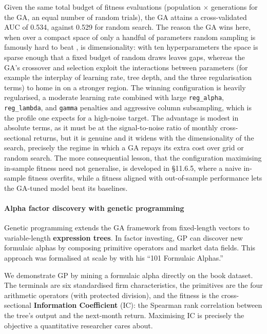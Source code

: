 Given the same total budget of fitness evaluations (population $\times$ generations for the GA, an equal number of random trials), the GA attains a cross-validated AUC of 0.534, against 0.529 for random search. The reason the GA wins here, when over a compact space of only a handful of parameters random sampling is famously hard to beat \citep{bergstra2012random}, is dimensionality: with ten hyperparameters the space is sparse enough that a fixed budget of random draws leaves gaps, whereas the GA's crossover and selection exploit the interactions between parameters (for example the interplay of learning rate, tree depth, and the three regularisation terms) to home in on a stronger region. The winning configuration is heavily regularised, a moderate learning rate combined with large \texttt{reg\_alpha}, \texttt{reg\_lambda}, and \texttt{gamma} penalties and aggressive column subsampling, which is the profile one expects for a high-noise target. The advantage is modest in absolute terms, as it must be at the signal-to-noise ratio of monthly cross-sectional returns, but it is genuine and it widens with the dimensionality of the search, precisely the regime in which a GA repays its extra cost over grid or random search. The more consequential lesson, that the configuration maximising in-sample fitness need not generalise, is developed in §11.6.5, where a naive in-sample fitness overfits, while a fitness aligned with out-of-sample performance lets the GA-tuned model beat its baselines.

\paragraph{Alpha factor discovery with genetic programming}

Genetic programming extends the GA framework from fixed-length vectors to variable-length \textbf{expression trees}. In factor investing, GP can discover new formulaic alphas by composing primitive operators and market data fields. This approach was formalised at scale by \cite{Kakushadze2016} with his ``101 Formulaic Alphas.''

We demonstrate GP by mining a formulaic alpha directly on the book dataset. The terminals are six standardised firm characteristics, the primitives are the four arithmetic operators (with protected division), and the fitness is the cross-sectional \textbf{Information Coefficient} (IC): the Spearman rank correlation between the tree's output and the next-month return. Maximising IC is precisely the objective a quantitative researcher cares about.

